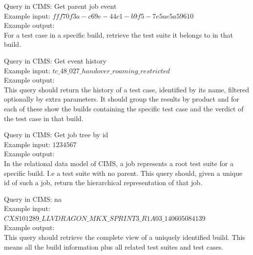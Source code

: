 Query in CIMS: Get parent job event \\
Example input: $fff70f3a-c69e-44c1-b9f5-7e5ae5a59610$\\
Example output: \\
For a test case in a specific build, retrieve the test suite it belongs to in that build.

Query in CIMS: Get event history \\
Example input: $tc\_48\_027\_handover\_roaming\_restricted$\\
Example output: \\
This query should return the history of a test case, identified by its name, filtered optionally by extra parameters. It should group the results by product and for each of these show the builds containing the specific test case and the verdict of the test case in that build.

Query in CIMS: Get job tree by id \\
Example input: $1234567$\\
Example output: \\
In the relational data model of CIMS, a job represents a root test suite for a specific build. I.e a test suite with no parent. This query should, given a unique id of such a job, return the hierarchical representation of that job.


Query in CIMS: na \\
Example input: $CXS101289\_LLVDRAGON\_MKX\_SPRINT3\_R1A03\_140605084139$ \\
Example output: \\
This query should retrieve the complete view of a uniquely identified build. This means all the build information plus all related test suites and test cases.



%
%
